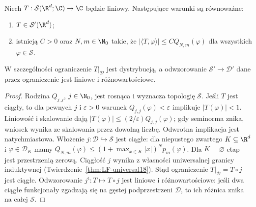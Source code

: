 \begin{twierdzenie}
\label{thm:tempered-estimate22}
Niech $T:\mathcal S(\R^d;\C)\to\C$ będzie liniowy.
Następujące warunki są równoważne:
\begin{enumerate}
\item $T\in\mathcal S'(\R^d)$;
\item istnieją $C>0$ oraz $N,m\in\N_0$ takie, że
$|\langle T,\varphi\rangle|\le C Q_{N,m}(\varphi)$
dla wszystkich $\varphi\in\mathcal S$.
\end{enumerate}
W szczególności ograniczenie $T|_{\mathcal D}$ jest dystrybucją,
a odwzorowanie $\mathcal S'\to\mathcal D'$ dane przez
ograniczenie jest liniowe i różnowartościowe.
\end{twierdzenie}
\begin{proof}
Rodzina $Q_{j,j}$, $j\in\N_0$, jest rosnąca
i wyznacza topologię $\mathcal S$. Jeśli $T$ jest ciągły,
to dla pewnych $j$ i $\varepsilon>0$ warunek
$Q_{j,j}(\varphi)<\varepsilon$ implikuje
$|T(\varphi)|<1$. Liniowość i skalowanie dają
$|T(\varphi)|\le (2/\varepsilon)Q_{j,j}(\varphi)$;
gdy seminorma znika, wniosek wynika ze skalowania przez
dowolną liczbę. Odwrotna implikacja jest natychmiastowa.
Włożenie $j:\mathcal D\hookrightarrow\mathcal S$ jest ciągłe:
dla niepustego zwartego $K\subseteq\R^d$ i
$\varphi\in\mathcal D_K$ mamy
$Q_{N,m}(\varphi)\le (1+\max_{x\in K}|x|)^N p_m(\varphi)$.
Dla $K=\varnothing$ etap jest przestrzenią zerową.
Ciągłość $j$ wynika z własności uniwersalnej granicy
induktywnej (Twierdzenie~\ref{thm:LF-universal18}).
Stąd ograniczenie $T|_{\mathcal D}=T\circ j$ jest ciągłe.
Odwzorowanie $j^{\mathrm t}:T\mapsto T\circ j$ jest
liniowe i różnowartościowe: jeśli dwa ciągłe funkcjonały
zgadzają się na gęstej podprzestrzeni $\mathcal D$,
to ich różnica znika na całej $\mathcal S$.
\end{proof}

